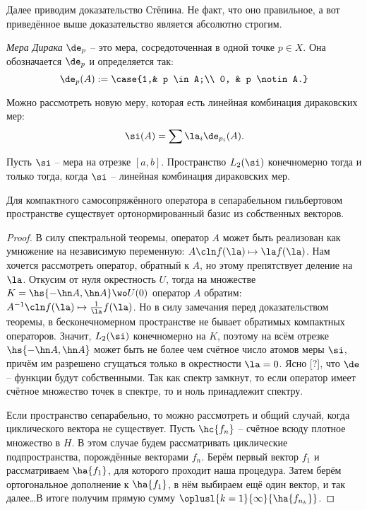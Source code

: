 \documentclass[a4paper]{article}
\begin{document}
\begin{petit}
Далее приводим доказательство Стёпина. Не факт, что оно правильное, а вот приведённое выше доказательство
является абсолютно строгим.

\begin{df}
\emph{Мера Дирака} $\de_p$ -- это мера, сосредоточенная в одной точке $p \in X$.
Она обозначается $\de_p$ и определяется так:
$$\de_p(A) := \case{1,& p \in A;\\ 0, & p \notin A.}$$
\end{df}
Можно рассмотреть новую меру, которая есть линейная комбинация дираковских мер:
$$\si(A)= \sum \la_i \de_{p_i}(A).$$

\begin{note}
Пусть $\si$ -- мера на отрезке $[a,b]$. Пространство $L_2(\si)$ конечномерно тогда и только
тогда, когда $\si$ -- линейная комбинация дираковских мер.
\end{note}

\begin{theorem}[Гильберта]
Для компактного самосопряжённого оператора в сепарабельном гильбертовом пространстве
существует ортонормированный базис из собственных векторов.
\end{theorem}
\begin{proof}
В силу спектральной теоремы, оператор $A$ может быть реализован как умножение на независимую
переменную: $A\cln f(\la) \mapsto \la f(\la)$. Нам хочется рассмотреть оператор, обратный к $A$,
но этому препятствует деление на $\la$. Откусим от нуля окрестность $U$, тогда на множестве
$K = \hs{-\hn A, \hn A} \wo U(0)$ оператор $A$ обратим: $A^{-1}\cln f(\la) \mapsto \frac{1}{\la}f(\la)$.
Но в силу замечания перед доказательством теоремы, в бесконечномерном пространстве не
бывает обратимых компактных операторов. Значит, $L_2(\si)$ конечномерно на $K$,
поэтому на всём отрезке $\hs{-\hn A, \hn A}$ может быть не более чем счётное число атомов меры $\si$,
причём им разрешено сгущаться только в окрестности $\la = 0$. Ясно [?], что $\de$ -- функции будут собственными.
Так как спектр замкнут, то если оператор имеет счётное множество точек в спектре, то и ноль принадлежит спектру.

Если пространство сепарабельно, то можно рассмотреть и общий случай, когда циклического вектора не существует.
Пусть $\hc{f_n}$ -- счётное всюду плотное множество в $H$. В этом случае будем рассматривать циклические
подпространства, порождённые векторами $f_n$. Берём первый вектор $f_1$ и рассматриваем $\ha{f_1}$,
для которого проходит наша процедура. Затем берём ортогональное дополнение к $\ha{f_1}$,
в нём выбираем ещё один вектор, и так далее\ldots В итоге получим прямую сумму
$\oplusl{k=1}{\infty}{\ha{f_{n_k}}}$.
\end{proof}

\end{petit}
\end{document}
